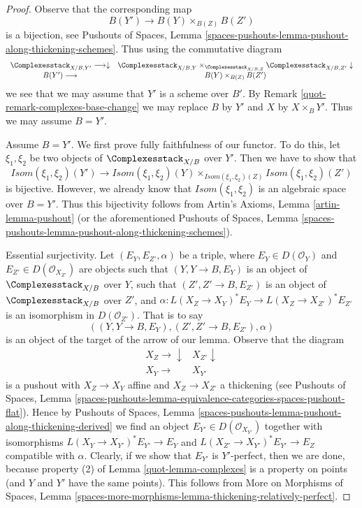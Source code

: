 \begin{proof}

Observe that the corresponding map
$$
B(Y') \longrightarrow B(Y) \times_{B(Z)} B(Z')
$$
is a bijection, see Pushouts of Spaces, Lemma
\ref{spaces-pushouts-lemma-pushout-along-thickening-schemes}.
Thus using the commutative diagram
$$
\begin{array}{cc}\Complexesstack_{X/B, Y'} \longrightarrow\downarrow & \Complexesstack_{X/B, Y}
\times_{\Complexesstack_{X/B, Z}}
\Complexesstack_{X/B, Z'}
\downarrow \\ B(Y') \longrightarrow & B(Y) \times_{B(Z)} B(Z')\end{array}
$$
we see that we may assume that $Y'$ is a scheme over $B'$. By
Remark \ref{quot-remark-complexes-base-change}
we may replace $B$ by $Y'$ and $X$ by $X \times_B Y'$.
Thus we may assume $B = Y'$.

\medskip\noindent
Assume $B = Y'$. We first prove fully faithfulness of our functor.
To do this, let $\xi_1, \xi_2$ be two objects of $\Complexesstack_{X/B}$
over $Y'$. Then we have to show that
$$
\mathit{Isom}(\xi_1, \xi_2)(Y') \longrightarrow
\mathit{Isom}(\xi_1, \xi_2)(Y)
\times_{\mathit{Isom}(\xi_1, \xi_2)(Z)}
\mathit{Isom}(\xi_1, \xi_2)(Z')
$$
is bijective. However, we already know that $\mathit{Isom}(\xi_1, \xi_2)$
is an algebraic space over $B = Y'$. Thus this bijectivity follows from
Artin's Axioms, Lemma \ref{artin-lemma-pushout} (or the aforementioned
Pushouts of Spaces, Lemma
\ref{spaces-pushouts-lemma-pushout-along-thickening-schemes}).

\medskip\noindent
Essential surjectivity. Let $(E_Y, E_{Z'}, \alpha)$ be a triple,
where $E_Y \in D(\mathcal{O}_Y)$ and $E_{Z'} \in D(\mathcal{O}_{X_{Z'}})$
are objects such that $(Y, Y \to B, E_Y)$ is an object of
$\Complexesstack_{X/B}$ over $Y$, such that
$(Z', Z' \to B, E_{Z'})$ is an object of $\Complexesstack_{X/B}$ over $Z'$,
and $\alpha : L(X_Z \to X_Y)^*E_Y \to L(X_Z \to X_{Z'})^*E_{Z'}$
is an isomorphism in $D(\mathcal{O}_{Z'})$.
That is to say
$$
((Y, Y \to B, E_Y), (Z', Z' \to B, E_{Z'}), \alpha)
$$
is an object of the target of the arrow of our lemma.
Observe that the diagram
$$
\begin{array}{cc}X_Z \longrightarrow\downarrow & X_{Z'} \downarrow \\ X_Y \longrightarrow & X_{Y'}\end{array}
$$
is a pushout with $X_Z \to X_Y$ affine and $X_Z \to X_{Z'}$ a thickening
(see Pushouts of Spaces, Lemma
\ref{spaces-pushouts-lemma-equivalence-categories-spaces-pushout-flat}).
Hence by Pushouts of Spaces, Lemma
\ref{spaces-pushouts-lemma-pushout-along-thickening-derived}
we find an object $E_{Y'} \in D(\mathcal{O}_{X_{Y'}})$
together with isomorphisms
$L(X_Y \to X_{Y'})^*E_{Y'} \to E_Y$ and
$L(X_{Z'} \to X_{Y'})^*E_{Y'} \to E_Z$
compatible with $\alpha$. Clearly, if we show that
$E_{Y'}$ is $Y'$-perfect, then we are done, because property (2)
of Lemma \ref{quot-lemma-complexes}
is a property on points (and $Y$ and $Y'$ have the same points).
This follows from More on Morphisms of Spaces, Lemma
\ref{spaces-more-morphisms-lemma-thickening-relatively-perfect}.
\end{proof}

